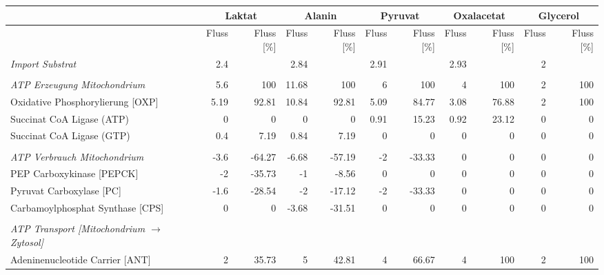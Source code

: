 \begin{landscape}
\begin{table}[!htp]
\centering
\tiny
\begin{tabular}{l rr rr rr rr rr}
\toprule
 & \multicolumn{2}{c}{\textbf{Laktat}}&\multicolumn{2}{c}{\textbf{Alanin}}&\multicolumn{2}{c}{\textbf{Pyruvat}} & \multicolumn{2}{c}{\textbf{Oxalacetat}} & \multicolumn{2}{c}{\textbf{Glycerol}}\\
 \midrule
 & Fluss & Fluss [\%] & Fluss & Fluss [\%] & Fluss & Fluss [\%] & Fluss & Fluss [\%] & Fluss & Fluss [\%]\\
\cmidrule(l){2-11}
\textit{Import Substrat} & 2.4 &  & 2.84 &  & 2.91 &  & 2.93 &  & 2 & \\
 &  &  &  &  &  &  &  &  &  & \\
\textit{ATP Erzeugung Mitochondrium} & 5.6 & 100 & 11.68 & 100 & 6 & 100 & 4 & 100 & 2 & 100\\
\hspace*{5mm}Oxidative Phosphorylierung [OXP] & 5.19 & 92.81 & 10.84 & 92.81 & 5.09 & 84.77 & 3.08 & 76.88 & 2 & 100\\
\hspace*{5mm}Succinat CoA Ligase (ATP) & 0 & 0 & 0 & 0 & 0.91 & 15.23 & 0.92 & 23.12 & 0 & 0\\
\hspace*{5mm}Succinat CoA Ligase (GTP) & 0.4 & 7.19 & 0.84 & 7.19 & 0 & 0 & 0 & 0 & 0 & 0\\
 &  &  &  &  &  &  &  &  &  & \\
\textit{ATP Verbrauch Mitochondrium} & -3.6 & -64.27 & -6.68 & -57.19 & -2 & -33.33 & 0 & 0 & 0 & 0\\
\hspace*{5mm}PEP Carboxykinase [PEPCK] & -2 & -35.73 & -1 & -8.56 & 0 & 0 & 0 & 0 & 0 & 0\\
\hspace*{5mm}Pyruvat Carboxylase [PC] & -1.6 & -28.54 & -2 & -17.12 & -2 & -33.33 & 0 & 0 & 0 & 0\\
\hspace*{5mm}Carbamoylphosphat Synthase [CPS] & 0 & 0 & -3.68 & -31.51 & 0 & 0 & 0 & 0 & 0 & 0\\
 &  &  &  &  &  &  &  &  &  & \\
\textit{ATP Transport [Mitochondrium $\rightarrow$ Zytosol]} &  &  &  &  &  &  &  &  &  & \\
\hspace*{5mm}Adeninenucleotide Carrier [ANT] & 2 & 35.73 & 5 & 42.81 & 4 & 66.67 & 4 & 100 & 2 & 100\\

\end{tabular}
\end{table}
\end{landscape}
